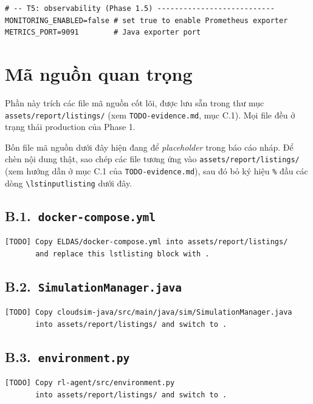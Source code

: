 \begin{appendices}
\begin{lstlisting}[style=yamlstyle]
# -- T5: observability (Phase 1.5) ---------------------------
MONITORING_ENABLED=false # set true to enable Prometheus exporter
METRICS_PORT=9091        # Java exporter port
\end{lstlisting}

\chapter{Mã nguồn quan trọng}
\label{app:source}

Phần này trích các file mã nguồn cốt lõi, được lưu sẵn trong thư mục
\texttt{assets/report/listings/} (xem \texttt{TODO-evidence.md},
mục C.1). Mọi file đều ở trạng thái production của Phase 1.

Bốn file mã nguồn dưới đây hiện đang để \emph{placeholder} trong báo
cáo nháp. Để chèn nội dung thật, sao chép các file tương ứng vào
\texttt{assets/report/listings/} (xem hướng dẫn ở mục C.1 của
\texttt{TODO-evidence.md}), sau đó bỏ ký hiệu \texttt{\%} đầu các dòng
\texttt{\textbackslash lstinputlisting} dưới đây.

\section*{B.1.\ \texttt{docker-compose.yml}}
% 
\begin{lstlisting}[style=yamlstyle, caption={Placeholder for docker-compose.yml.}]
[TODO] Copy ELDAS/docker-compose.yml into assets/report/listings/
       and replace this lstlisting block with .
\end{lstlisting}

\section*{B.2.\ \texttt{SimulationManager.java}}
% 
\begin{lstlisting}[style=javastyle, caption={Placeholder for SimulationManager.java.}]
[TODO] Copy cloudsim-java/src/main/java/sim/SimulationManager.java
       into assets/report/listings/ and switch to .
\end{lstlisting}

\section*{B.3.\ \texttt{environment.py}}
% 
\begin{lstlisting}[style=pythonstyle, caption={Placeholder for environment.py.}]
[TODO] Copy rl-agent/src/environment.py
       into assets/report/listings/ and switch to .
\end{lstlisting}


\end{appendices}
